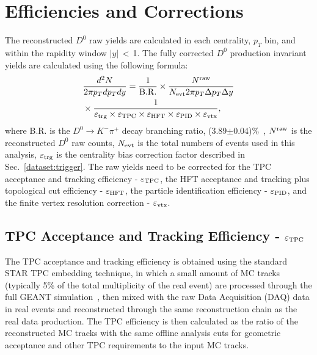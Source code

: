 \documentclass[%
 reprint,	
 amsmath,amssymb,
 aps,
 prc,
]{revtex4-1}
\begin{document}
\section{Efficiencies and Corrections}
\label{correction}

The reconstructed $D^0$ raw yields are calculated in each centrality, $p_{T}$ bin, and within the rapidity window $|y|$\,$<$\,1. The fully corrected $D^0$ production invariant yields are calculated using the following formula:
\begin{equation}
  \begin{aligned}
& \frac{d^2N}{2\pi p_{T}dp_{T}dy} = \frac{1}{\rm B.R.} \times \frac{N^{\rm raw}}{N_{\rm evt} 2\pi p_{T}\Delta p_{T}\Delta y} \\
& \times \frac{1}{\varepsilon_{\rm trg}\times\varepsilon_{\rm TPC}\times\varepsilon_{\rm HFT}\times\varepsilon_{\rm PID}\times\varepsilon_{\rm vtx}},
  \end{aligned}
\label{equ:invariantyield}
\end{equation}
where B.R. is the $D^0\rightarrow K^-\pi^+$ decay branching ratio, (3.89$\pm$0.04)\%~\cite{pdg}, $N^{\rm raw}$ is the reconstructed $D^0$ raw counts, $N_{\rm evt}$ is the total numbers of events used in this analysis, $\varepsilon_{\rm trg}$ is the centrality bias correction factor described in Sec.~\ref{dataset:trigger}. The raw yields need to be corrected for the TPC acceptance and tracking efficiency - $\varepsilon_{\rm TPC}$, the HFT acceptance and tracking plus topological cut efficiency - $\varepsilon_{\rm HFT}$, the particle identification efficiency - $\varepsilon_{\rm PID}$, and the finite vertex resolution correction - $\varepsilon_{\rm vtx}$.

\subsection{TPC Acceptance and Tracking Efficiency - $\varepsilon_{\rm TPC}$}
\label{correction:tpc}

The TPC acceptance and tracking efficiency is obtained using the standard STAR TPC embedding technique, in which a small amount of MC tracks (typically 5\% of the total multiplicity of the real event) are processed through the full GEANT simulation~\cite{GEANT3}, then mixed with the raw Data Acquisition (DAQ) data in real events and reconstructed through the same reconstruction chain as the real data production. The TPC efficiency is then calculated as the ratio of the reconstructed MC tracks with the same offline analysis cuts for geometric acceptance and other TPC requirements to the input MC tracks.
\end{document}
